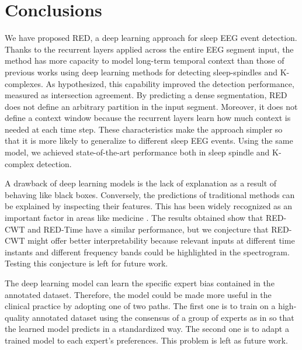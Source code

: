 \documentclass[conference]{IEEEtran}
\begin{document}
\section{Conclusions}


We have proposed RED, a deep learning approach for sleep EEG event detection. Thanks to the recurrent layers applied across the entire EEG segment input, the method has more capacity to model long-term temporal context than those of previous works using deep learning methods for detecting sleep-spindles and K-complexes. As hypothesized, this capability improved the detection performance, measured as intersection agreement. By predicting a dense segmentation, RED does not define an arbitrary partition in the input segment. Moreover, it does not define a context window because the recurrent layers learn how much context is needed at each time step. These characteristics make the approach simpler so that it is more likely to generalize to different sleep EEG events. Using the same model, we achieved state-of-the-art performance both in sleep spindle and K-complex detection.

A drawback of deep learning models is the lack of explanation as a result of behaving like black boxes. Conversely, the predictions of traditional methods can be explained by inspecting their features. This has been widely recognized as an important factor in areas like medicine \cite{adadi2018peeking}. The results obtained show that RED-CWT and RED-Time have a similar performance, but we conjecture that RED-CWT might offer better interpretability because relevant inputs at different time instants and different frequency bands could be highlighted in the spectrogram. Testing this conjecture is left for future work.

The deep learning model can learn the specific expert bias contained in the annotated dataset. Therefore, the model could be made more useful in the clinical practice by adopting one of two paths. The first one is to train on a high-quality annotated dataset using the consensus of a group of experts as in \cite{warby2014sleep} so that the learned model predicts in a standardized way. The second one is to adapt a trained model to each expert's preferences. This problem is left as future work.

\appendix
\end{document}

